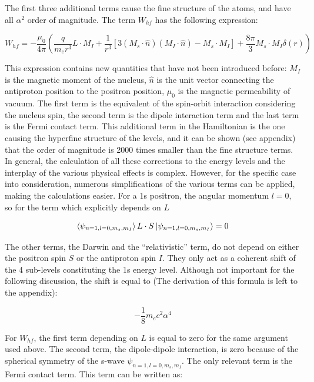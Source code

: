 The first three additional terms cause the fine structure of the atoms, and have all $\alpha^2$ order of magnitude. The term $W_{hf}$ has the following expression:

\begin{equation}
W_{hf} = - \frac{\mu_{0}}{4 \pi} \left( \frac{q}{m_{e} r^3} L \cdot M_{I} + \frac{1}{ r^3} [3(M_s \cdot \hat{n} )( M_I \cdot \hat{n}) - M_{s} \cdot M_{I}] + \frac{8 \pi}{3} M_s \cdot M_{I} \delta(r) \right)
\end{equation}

This expression contains new quantities that have not been introduced before: $M_{I}$ is the magnetic moment of the nucleus, $\hat{n}$ is the unit vector connecting the antiproton position to the positron position, $\mu_0$ is the magnetic permeability of vacuum. The first term is the equivalent of the spin-orbit interaction considering the nucleus spin, the second term is the dipole interaction term and the last term is the Fermi contact term. This additional term in the Hamiltonian is the one causing the hyperfine structure of the levels, and it can be shown (see appendix) that the order of magnitude is 2000 times smaller than the fine structure terms.
In general, the calculation of all these corrections to the energy levels and the interplay of the various physical effects is complex. However, for the specific case into consideration, numerous simplifications of the various terms can be applied, making the calculations easier. For a 1s positron, the angular momentum $ l = 0$, so for the term which explicitly depends on $L$

\begin{equation}
 \braket{\psi_{n=1,l=0,m_s,m_I}}  L \cdot S \ket{\psi_{n=1,l=0,m_s,m_I}} = 0
\end{equation}

The other terms, the Darwin and the ``relativistic'' term, do not depend on either the positron spin $S$ or the antiproton spin $I$. They only act as a coherent shift of the 4 sub-levels constituting the 1s energy level. Although not important for the following discussion, the shift is equal to (The derivation of this formula is left to the appendix):

\begin{equation}
- \frac{1}{8} m_{e} c^{2} \alpha^{4}
\end{equation}

For $W_{hf}$, the first term depending on $L$ is equal to zero for the same argument used above. The second term, the dipole-dipole interaction, is zero because of the spherical symmetry of the s-wave $\psi_{n=1,l=0,m_s,m_I}$. The only relevant term is the Fermi contact term. This term can be written as:


